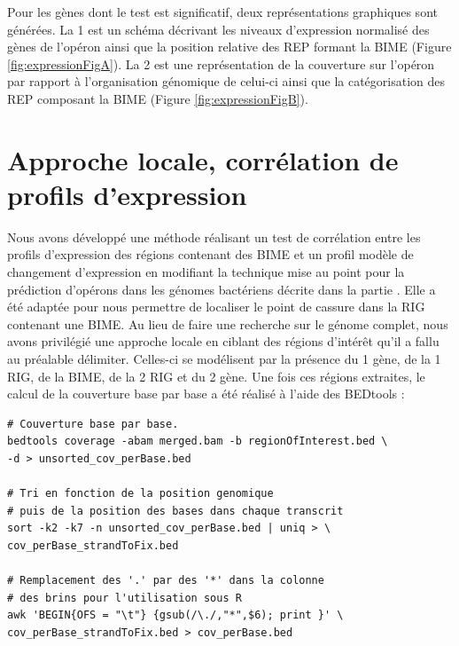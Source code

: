 \documentclass[12pt,a4paper]{report}
\begin{document}
\begin{onehalfspace}
Pour les gènes dont le test est significatif, deux représentations graphiques sont générées. La 1 est un schéma décrivant les niveaux d'expression normalisé des gènes de l'opéron ainsi que la position relative des REP formant la BIME (Figure \autoref{fig:expressionFigA}). La 2 est une représentation de la couverture sur l'opéron par rapport à l'organisation génomique de celui-ci ainsi que la catégorisation des REP composant la BIME (Figure \autoref{fig:expressionFigB}).

\section*{Approche locale, corrélation de profils d'expression}
\label{approche_locale}
Nous avons développé une méthode réalisant un test de corrélation entre les profils d'expression des régions contenant des BIME et un profil modèle de changement d'expression en modifiant la technique mise au point pour la prédiction d'opérons dans les génomes bactériens \citep{Fortino2014} décrite dans la partie . Elle a été adaptée pour nous permettre de localiser le point de cassure dans la RIG contenant une BIME. Au lieu de faire une recherche sur le génome complet, nous avons privilégié une approche locale en ciblant des régions d'intérêt qu'il a fallu au préalable délimiter. Celles-ci se modélisent par la présence du 1 gène, de la 1 RIG, de la BIME, de la 2 RIG et du 2 gène. Une fois ces régions extraites, le calcul de la couverture base par base a été réalisé à l'aide des BEDtools :

\begin{lstlisting}[frame=single]
# Couverture base par base.
bedtools coverage -abam merged.bam -b regionOfInterest.bed \
-d > unsorted_cov_perBase.bed

# Tri en fonction de la position genomique 
# puis de la position des bases dans chaque transcrit
sort -k2 -k7 -n unsorted_cov_perBase.bed | uniq > \
cov_perBase_strandToFix.bed

# Remplacement des '.' par des '*' dans la colonne
# des brins pour l'utilisation sous R
awk 'BEGIN{OFS = "\t"} {gsub(/\./,"*",$6); print }' \
cov_perBase_strandToFix.bed > cov_perBase.bed
\end{lstlisting}


\end{onehalfspace}
\end{document}
